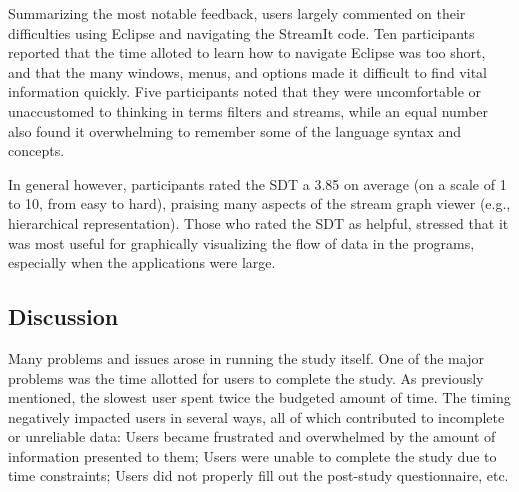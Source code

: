 \documentclass[times, 10pt,twocolumn]{article}
\begin{document}
Summarizing  the most  notable  feedback, users  largely commented  on
their difficulties using Eclipse and navigating the StreamIt code. Ten
participants reported that  the time alloted to learn  how to navigate
Eclipse was too  short, and that the many  windows, menus, and options
made   it  difficult   to  find   vital  information   quickly.   Five
participants  noted that  they were  uncomfortable or  unaccustomed to
thinking  in terms  filters and  streams, while  an equal  number also
found  it overwhelming  to remember  some of  the language  syntax and
concepts.

In general however, participants rated the SDT a 3.85 on average (on a
scale of  1 to 10,  from easy to  hard), praising many aspects  of the
stream  graph viewer (e.g.,  hierarchical representation).   Those who
rated  the  SDT as  helpful,  stressed that  it  was  most useful  for
graphically visualizing  the flow of data in  the programs, especially
when the applications were large.


\subsection{Discussion}

Many problems and issues arose in running the study itself. One of the
major  problems  was the  time  allotted  for  users to  complete  the
study.  As previously  mentioned,  the slowest  user  spent twice  the
budgeted  amount of  time.  The  timing negatively  impacted  users in
several  ways, all of  which contributed  to incomplete  or unreliable
data:  Users  became  frustrated  and  overwhelmed by  the  amount  of
information presented to them; Users were unable to complete the study
due  to  time  constraints;  Users  did  not  properly  fill  out  the
post-study questionnaire, etc.
\end{document}
